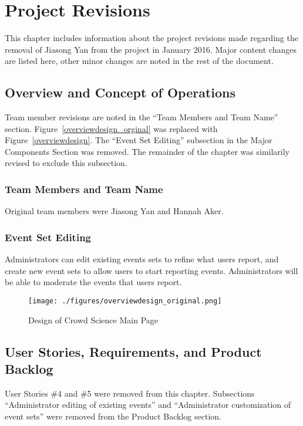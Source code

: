 

\chapter{Project Revisions}\label{chap:revisions}
This chapter includes information about the project revisions made regarding the removal of Jiasong Yan from the project in January 2016. Major content changes are listed here, other minor changes are noted in the rest of the document.

\section{Overview and Concept of Operations}
Team member revisions are noted in the ``Team Members and Team Name'' section.  Figure~\ref{overviewdesign_orginal} was replaced with Figure~\ref{overviewdesign}. The ``Event Set Editing'' subsection in the Major Components Section was removed. The remainder of the chapter was similarily revised to exclude this subsection.

\subsection{Team Members and Team Name}
Original team members were Jiasong Yan and Hannah Aker.

\subsection{Event Set Editing}
Administrators can edit existing events sets to refine what users report, and create new event sets to allow users to start reporting events.  Administrators will be able to moderate the events that users report.

\begin{figure}[tbh]
\begin{center}
\texttt{[image: ./figures/overviewdesign\_original.png]}
\end{center}
\caption{Design of Crowd Science Main Page\label{overviewdesign_original}}
\end{figure}

\section{User Stories, Requirements, and Product Backlog}
User Stories \#4 and \#5 were removed from this chapter. Subsections ``Administrator editing of existing events'' and ``Administrator customization of event sets'' were removed from the Product Backlog section.


